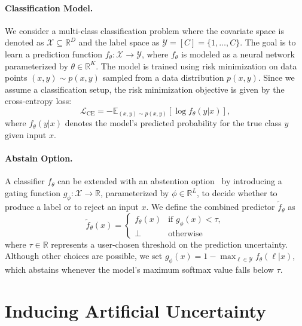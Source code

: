 \paragraph{Classification Model.} We consider a multi-class classification problem where the covariate space is denoted as \(\mathcal{X} \subseteq \mathbb{R}^D\) and the label space as \(\mathcal{Y} = [C] = \{1, \dots, C\}\). The goal is to learn a prediction function \(f_\theta: \mathcal{X} \to \mathcal{Y}\), where \(f_\theta\) is modeled as a neural network parameterized by \(\theta \in \mathbb{R}^K\). The model is trained using risk minimization on data points \((x, y) \sim p(x, y) \) sampled from a data distribution \(p(x, y)\). Since we assume a classification setup, the risk minimization objective is given by the cross-entropy loss:
\begin{equation}
     \mathcal{L}_\text{CE} = - \mathbb{E}_{(x,y) \sim p(x, y)} [\log f_\theta(y | x)],
\end{equation}
where \(f_\theta(y|x)\) denotes the model's predicted probability for the true class $y$ given input \(x\).

\paragraph{Abstain Option.} A classifier $f_\theta$ can be extended with an abstention option~\citep{el2010foundations} by introducing a gating function \(g_\phi : \mathcal{X} \to \mathbb{R}\), parameterized by \(\phi \in \mathbb{R}^L\), to decide whether to produce a label or to reject an input $x$. We define the combined predictor \(\tilde{f}_\theta\) as
\begin{equation}\label{eq:gating}
\tilde{f}_\theta(x) = 
\begin{cases}
f_\theta(x) & \text{if } g_\phi(x) < \tau,\\
\bot & \text{otherwise}
\end{cases}
\end{equation}
where $\tau \in \mathbb{R}$ represents a user-chosen threshold on the prediction uncertainty. Although other choices are possible, we set \(g_\phi(x) = 1 - \max_{\ell \in \mathcal{Y}} f_\theta(\ell|x)\), which abstains whenever the model’s maximum softmax value falls below \(\tau\).


\section{Inducing Artificial Uncertainty}

